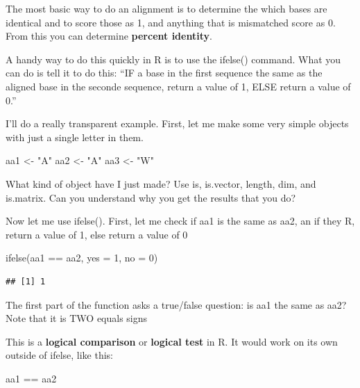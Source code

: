 \documentclass[
]{book}
\newenvironment{Shaded}{\begin{snugshade}}{\end{snugshade}}
\newcommand{\AttributeTok}[1]{\textcolor[rgb]{0.77,0.63,0.00}{#1}}
\newcommand{\DecValTok}[1]{\textcolor[rgb]{0.00,0.00,0.81}{#1}}
\newcommand{\FunctionTok}[1]{\textcolor[rgb]{0.00,0.00,0.00}{#1}}
\newcommand{\NormalTok}[1]{#1}
\newcommand{\OtherTok}[1]{\textcolor[rgb]{0.56,0.35,0.01}{#1}}
\newcommand{\SpecialCharTok}[1]{\textcolor[rgb]{0.00,0.00,0.00}{#1}}
\newcommand{\StringTok}[1]{\textcolor[rgb]{0.31,0.60,0.02}{#1}}
\begin{document}
The most basic way to do an alignment is to determine the which bases are identical and to score those as 1, and anything that is mismatched score as 0. From this you can determine \textbf{percent identity}.

A handy way to do this quickly in R is to use the ifelse() command. What you can do is tell it to do this: ``IF a base in the first sequence the same as the aligned base in the seconde sequence, return a value of 1, ELSE return a value of 0.''

I'll do a really transparent example. First, let me make some very simple objects with just a single letter in them.

\begin{Shaded}
\begin{Highlighting}[]
\NormalTok{aa1 }\OtherTok{\textless{}{-}} \StringTok{"A"}
\NormalTok{aa2 }\OtherTok{\textless{}{-}} \StringTok{"A"}
\NormalTok{aa3 }\OtherTok{\textless{}{-}} \StringTok{"W"}
\end{Highlighting}
\end{Shaded}

What kind of object have I just made? Use is, is.vector, length, dim, and is.matrix. Can you understand why you get the results that you do?

Now let me use ifelse(). First, let me check if aa1 is the same as aa2, an if they R, return a value of 1, else return a value of 0

\begin{Shaded}
\begin{Highlighting}[]
\FunctionTok{ifelse}\NormalTok{(aa1 }\SpecialCharTok{==}\NormalTok{ aa2, }\AttributeTok{yes =}  \DecValTok{1}\NormalTok{, }\AttributeTok{no =} \DecValTok{0}\NormalTok{)}
\end{Highlighting}
\end{Shaded}

\begin{verbatim}
## [1] 1
\end{verbatim}

The first part of the function asks a true/false question: is aa1 the same as aa2? Note that it is TWO equals signs

This is a \textbf{logical comparison} or \textbf{logical test} in R. It would work on its own outside of ifelse, like this:

\begin{Shaded}
\begin{Highlighting}[]
\NormalTok{aa1 }\SpecialCharTok{==}\NormalTok{ aa2}
\end{Highlighting}
\end{Shaded}
\end{document}
